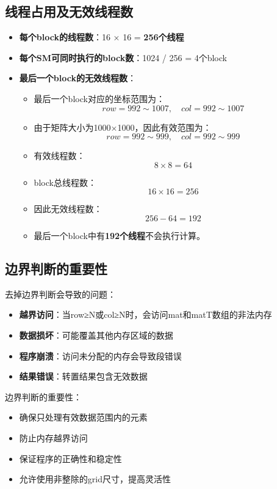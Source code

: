 \subsection{线程占用及无效线程数}

\begin{itemize}
    \item \textbf{每个block的线程数}：16 × 16 = \textbf{256个线程}
    \item \textbf{每个SM可同时执行的block数}：1024 / 256 = 4个block
    \item \textbf{最后一个block的无效线程数}：
    \begin{itemize}
        \item 最后一个block对应的坐标范围为：
        \[
        row = 992 \sim 1007,\quad col = 992 \sim 1007
        \]
        \item 由于矩阵大小为1000×1000，因此有效范围为：
        \[
        row = 992 \sim 999,\quad col = 992 \sim 999
        \]
        \item 有效线程数：
        \[
        8 \times 8 = 64
        \]
        \item block总线程数：
        \[
        16 \times 16 = 256
        \]
        \item 因此无效线程数：
        \[
        256 - 64 = 192
        \]
        \item 最后一个block中有\textbf{192个线程}不会执行计算。
    \end{itemize}
\end{itemize}

\subsection{边界判断的重要性}

去掉边界判断会导致的问题：

\begin{itemize}
    \item \textbf{越界访问}：当row≥N或col≥N时，会访问mat和matT数组的非法内存
    \item \textbf{数据损坏}：可能覆盖其他内存区域的数据
    \item \textbf{程序崩溃}：访问未分配的内存会导致段错误
    \item \textbf{结果错误}：转置结果包含无效数据
\end{itemize}

边界判断的重要性：
\begin{itemize}
    \item 确保只处理有效数据范围内的元素
    \item 防止内存越界访问
    \item 保证程序的正确性和稳定性
    \item 允许使用非整除的grid尺寸，提高灵活性
\end{itemize}

